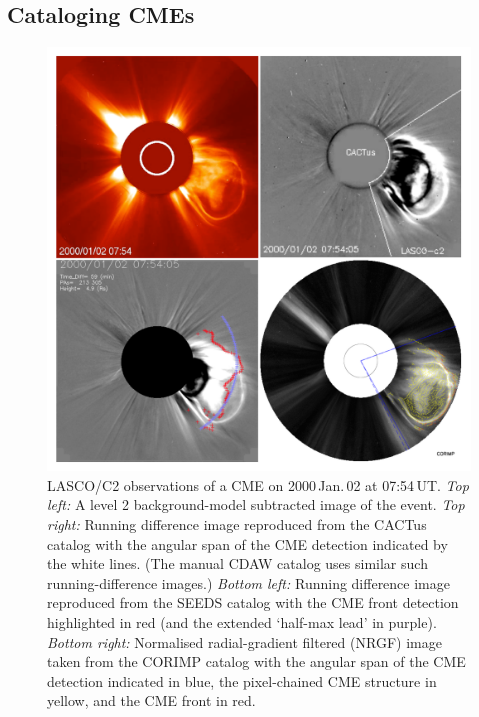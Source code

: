 \documentclass[referee,a4paper,12pt,traditabstract]{swsc}
\begin{document}
\begin{linenumbers}
\section{Cataloging CMEs}
\label{sect_catalogs}

\begin{figure}[!h]
\centerline{\includegraphics[width=\linewidth]{images/20000102_four.pdf}}
\caption{LASCO/C2 observations of a CME on 2000\,Jan.\,02 at 07:54\,UT. \emph{Top left:} A level 2 background-model subtracted image of the event. \emph{Top right:} Running difference image reproduced from the CACTus catalog with the angular span of the CME detection indicated by the white lines. (The manual CDAW catalog uses similar such running-difference images.) \emph{Bottom left:} Running difference image reproduced from the SEEDS catalog with the CME front detection highlighted in red (and the extended `half-max lead' in purple). \emph{Bottom right:} Normalised radial-gradient filtered (NRGF) image taken from the CORIMP catalog with the angular span of the CME detection indicated in blue, the pixel-chained CME structure in yellow, and the CME front in red.}
\label{20000102_four}
\end{figure}


\end{linenumbers}
\end{document}
